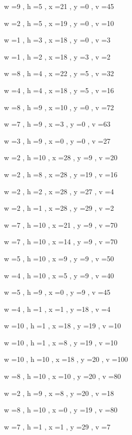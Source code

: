 \documentclass[11pt]{article}
\begin{document}


w =9 , h =5 , x =21 , y =0 , v =45
\par
w =2 , h =5 , x =19 , y =0 , v =10
\par
w =1 , h =3 , x =18 , y =0 , v =3
\par
w =1 , h =2 , x =18 , y =3 , v =2
\par
w =8 , h =4 , x =22 , y =5 , v =32
\par
w =4 , h =4 , x =18 , y =5 , v =16
\par
w =8 , h =9 , x =10 , y =0 , v =72
\par
w =7 , h =9 , x =3 , y =0 , v =63
\par
w =3 , h =9 , x =0 , y =0 , v =27
\par
w =2 , h =10 , x =28 , y =9 , v =20
\par
w =2 , h =8 , x =28 , y =19 , v =16
\par
w =2 , h =2 , x =28 , y =27 , v =4
\par
w =2 , h =1 , x =28 , y =29 , v =2
\par
w =7 , h =10 , x =21 , y =9 , v =70
\par
w =7 , h =10 , x =14 , y =9 , v =70
\par
w =5 , h =10 , x =9 , y =9 , v =50
\par
w =4 , h =10 , x =5 , y =9 , v =40
\par
w =5 , h =9 , x =0 , y =9 , v =45
\par
w =4 , h =1 , x =1 , y =18 , v =4
\par
w =10 , h =1 , x =18 , y =19 , v =10
\par
w =10 , h =1 , x =8 , y =19 , v =10
\par
w =10 , h =10 , x =18 , y =20 , v =100
\par
w =8 , h =10 , x =10 , y =20 , v =80
\par
w =2 , h =9 , x =8 , y =20 , v =18
\par
w =8 , h =10 , x =0 , y =19 , v =80
\par
w =7 , h =1 , x =1 , y =29 , v =7
\par
\newpage
\end{document}

